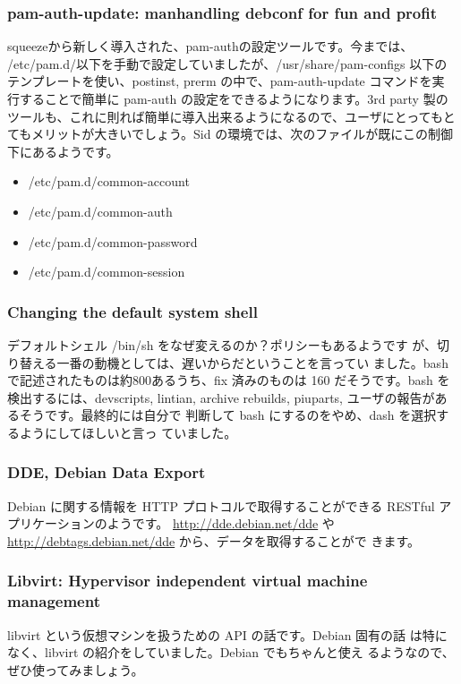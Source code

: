 \documentclass[mingoth,a4paper]{jsarticle}
\begin{document}
\subsubsection{pam-auth-update: manhandling debconf for fun and profit}
       squeezeから新しく導入された、pam-authの設定ツールです。今までは、
       /etc/pam.d/以下を手動で設定していましたが、/usr/share/pam-configs 以下の
       テンプレートを使い、postinst, prerm の中で、pam-auth-update コマンドを実
       行することで簡単に pam-auth の設定をできるようになります。3rd party 製の
       ツールも、これに則れば簡単に導入出来るようになるので、ユーザにとってもと
       てもメリットが大きいでしょう。Sid の環境では、次のファイルが既にこの制御
       下にあるようです。
 \begin{itemize}
  \item /etc/pam.d/common-account
  \item /etc/pam.d/common-auth
  \item /etc/pam.d/common-password
  \item /etc/pam.d/common-session
 \end{itemize}


\subsubsection{Changing the default system shell}
       デフォルトシェル /bin/sh をなぜ変えるのか？ポリシーもあるようです
       が、切り替える一番の動機としては、遅いからだということを言ってい
       ました。bash で記述されたものは約800あるうち、fix 済みのものは
       160 だそうです。bash を検出するには、devscripts, lintian, archive
       rebuilds, piuparts, ユーザの報告があるそうです。最終的には自分で
       判断して bash にするのをやめ、dash を選択するようにしてほしいと言っ
       ていました。

\subsubsection{DDE, Debian Data Export}
      Debian に関する情報を HTTP プロトコルで取得することができる
      RESTful アプリケーションのようです。
      \url{http://dde.debian.net/dde} や
      \url{http://debtags.debian.net/dde} から、データを取得することがで
      きます。

\subsubsection{Libvirt: Hypervisor independent virtual machine management}
       libvirt という仮想マシンを扱うための API の話です。Debian 固有の話
       は特になく、libvirt の紹介をしていました。Debian でもちゃんと使え
       るようなので、ぜひ使ってみましょう。
\end{document}
